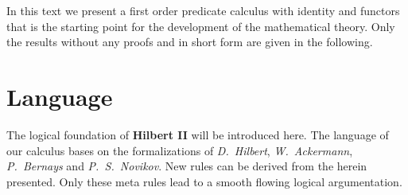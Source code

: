 \documentclass[a4paper,german,10pt,twoside]{book}
\theoremstyle{definition}
\theoremstyle{remark}
\begin{document}
\par
In this text we present a first order predicate calculus with identity and functors that is the starting point for the development of the mathematical theory. Only the results without any proofs and in short form are given in the following.


\chapter{Language} \label{chapter3} \hypertarget{chapter3}{}

The logical foundation of \textbf{Hilbert II} will be introduced here. The language of our calculus bases on the formalizations of \emph{D.~Hilbert}, \emph{W.~Ackermann}, \emph{P.~Bernays} and \emph{P.~S.~Novikov}. New rules 
can be derived from the herein presented. Only these meta rules lead to a smooth flowing logical argumentation.
\end{document}
